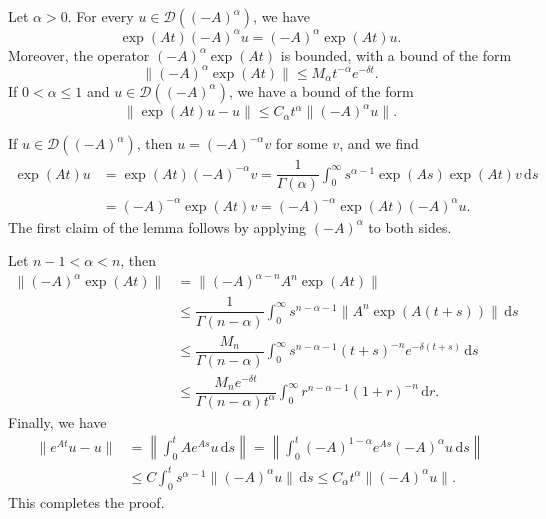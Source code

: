 \begin{Lemma}
\label{lem:fractional-power-semigroup-smoothing-holder}
Let $\alpha>0$. For every $u\in\mathcal{D}((-A)^\alpha)$, we have\[\exp(At)(-A)^\alpha u=(-A)^\alpha\exp(At)u.\]Moreover, the operator $(-A)^\alpha\exp(At)$ is bounded, with a bound of the form
\begin{equation}\label{eq:analytic-semigroup-fractional-power-smoothing-bound}
\|(-A)^\alpha\exp(At)\|\leq M_\alpha t^{-\alpha}e^{-\delta t}.
\end{equation}
If $0<\alpha\leq1$ and $u\in\mathcal{D}((-A)^\alpha)$, we have a bound of the form
\begin{equation}\label{eq:analytic-semigroup-fractional-domain-holder-orbit-bound}
\|\exp(At)u-u\|\leq C_\alpha t^\alpha\|(-A)^\alpha u\|.
\end{equation}

\end{Lemma}

\begin{Proof}
If $u\in\mathcal{D}((-A)^\alpha)$, then $u=(-A)^{-\alpha}v$ for some $v$, and we find\[\begin{aligned}
\exp(At)u&=\exp(At)(-A)^{-\alpha}v=\dfrac{1}{\Gamma(\alpha)}\int_0^\infty s^{\alpha-1}\exp(As)\exp(At)v\,\mathrm{d}s\\
&=(-A)^{-\alpha}\exp(At)v=(-A)^{-\alpha}\exp(At)(-A)^\alpha u.
\end{aligned}\]The first claim of the lemma follows by applying $(-A)^\alpha$ to both sides.\par Let $n-1<\alpha<n$, then\[\begin{aligned}
\|(-A)^\alpha\exp(At)\|&=\|(-A)^{\alpha-n}A^n\exp(At)\|\\
&\leq\dfrac{1}{\Gamma(n-\alpha)}\int_0^\infty s^{n-\alpha-1}\|A^n\exp(A(t+s))\|\,\mathrm{d}s\\
&\leq\dfrac{M_n}{\Gamma(n-\alpha)}\int_0^\infty s^{n-\alpha-1}(t+s)^{-n}e^{-\delta(t+s)}\,\mathrm{d}s\\
&\leq\dfrac{M_ne^{-\delta t}}{\Gamma(n-\alpha)t^\alpha}\int_0^\infty r^{n-\alpha-1}(1+r)^{-n}\,\mathrm{d}r.
\end{aligned}\]Finally, we have\[\begin{aligned}
\|e^{At}u-u\|&=\left\|\int_0^t Ae^{As}u\,\mathrm{d}s\right\|=\left\|\int_0^t(-A)^{1-\alpha}e^{As}(-A)^\alpha u\,\mathrm{d}s\right\|\\
&\leq C\int_0^t s^{\alpha-1}\|(-A)^\alpha u\|\,\mathrm{d}s\leq C_\alpha t^\alpha\|(-A)^\alpha u\|.
\end{aligned}\]This completes the proof.
\end{Proof}

